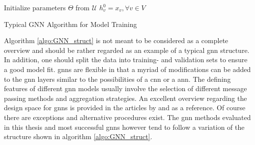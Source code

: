 	\begin{algorithm}[h]
		\scriptsize
		\SetAlgoLined
		\nl Initialize parameters $\Theta$ from $\mathcal{U}$\;
		\nl $h_{v}^{0} = x_{v},\forall v \in V$\\
		\nl {}
		\caption{Typical GNN Algorithm for Model Training}
		\label{algo:GNN_struct}
	\end{algorithm}

	\noindent Algorithm \ref{algo:GNN_struct} is not meant to be considered as
	a complete overview and should be rather regarded as an example of a typical 
	\acs{gnn} structure. In addition, one should split the data into training-
	and validation sets to ensure a good model fit. \acs{gnn}s are flexible in that a 
	myriad of modifications can be added to the \acs{gnn} layers similar to the 
	possibilities of a \acs{cnn} or a \ac{ann}. The defining features of
	different \acs{gnn} models usually involve the selection of different message passing methods 
	and aggregation strategies. An excellent overview regarding the design space 
	for \acs{gnn}s is provided in the articles by \cite{you2020design} and 
	\cite{zhou2020graph} as a reference. Of course there are exceptions and 
	alternative procedures exist. The \acs{gnn} methods evaluated in this thesis and 
	most successful \acs{gnn}s however tend to follow a variation of the structure 
	shown in algorithm \ref{algo:GNN_struct}.  \\

